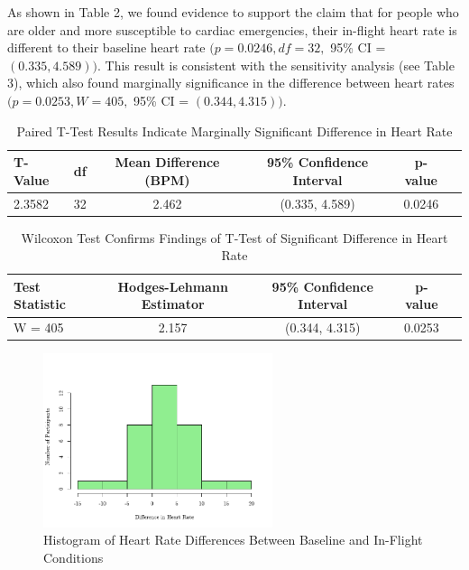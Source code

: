 \documentclass{article}
\begin{document}
\begin{enumerate}
		As shown in Table 2, we found evidence to support the claim that for people who are older and more susceptible to cardiac emergencies, their in-flight heart rate is different to their baseline heart rate $(p = 0.0246, df = 32,$ 95\% CI = $(0.335, 4.589))$. This result is consistent with the sensitivity analysis (see Table 3), which also found marginally significance in the difference between heart rates $(p = 0.0253, W = 405,$ 95\% CI = $(0.344, 4.315))$.

		\begin{table}[h!]
			\centering
			\footnotesize
			\caption{Paired T-Test Results Indicate Marginally Significant Difference in Heart Rate}
			\label{tab:t_test_results}
			\begin{tabular}{lccccc}
			\toprule
			\textbf{T-Value}  & \textbf{df} & \textbf{Mean Difference (BPM)} & \textbf{95\% Confidence Interval} & \textbf{p-value} \\
			\midrule
			2.3582      & 32          & 2.462                     & (0.335, 4.589)                    & 0.0246            \\
			\bottomrule
			\end{tabular}
		\end{table}

		\begin{table}[h!]
			\centering
			\footnotesize
			\caption{Wilcoxon Test Confirms Findings of T-Test of Significant Difference in Heart Rate}
			\label{tab:wilcoxon_results}
			\begin{tabular}{lcccc}
			\toprule
			\textbf{Test Statistic} & \textbf{Hodges-Lehmann Estimator} & \textbf{95\% Confidence Interval} & \textbf{p-value} \\
			\midrule
			W = 405                 & 2.157                           & (0.344, 4.315)                    & 0.0253            \\
			\bottomrule
			\end{tabular}
		\end{table}

			\newpage
			
			
			
			

			\begin{figure}[h!]
				\centering
				\includegraphics[width=0.6\textwidth]{HistogramCaseStudy1.png}
				\caption{Histogram of Heart Rate Differences Between Baseline and In-Flight Conditions}
				\label{fig:histogram}
			\end{figure}


\end{enumerate}
\end{document}
